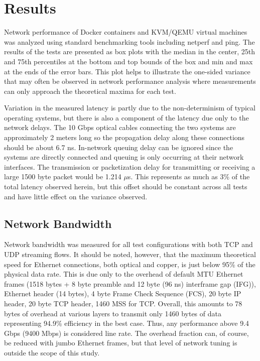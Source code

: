 \chapter{Results}
\label{cha:results}
\label{sec:results}
Network performance of Docker containers and KVM/QEMU virtual machines was analyzed using standard benchmarking tools including netperf and ping.  
The results of the tests are presented as box plots with the median in the center, 25th and 75th percentiles at the bottom and top bounds of the box and min and max at the ends of the error bars.
This plot helps to illustrate the one-sided variance that may often be observed in network performance analysis where measurements can only approach the theoretical maxima for each test.  

Variation in the measured latency is partly due to the non-determinism of typical operating systems, but there is also a component of the latency due only to the network delays.
The 10 Gbps optical cables connecting the two systems are approximately 2 meters long so the propagation delay along these connections should be about 6.7 ns.
In-network queuing delay can be ignored since the systems are directly connected and queuing is only occurring at their network interfaces.
The transmission or packetization delay for transmitting or receiving a large 1500 byte packet would be 1.214 $\mu$s.
This represents as much as 3\% of the total latency observed herein, but this offset should be constant across all tests and have little effect on the variance observed. 

\section{Network Bandwidth} %
\label{sec:networkbandwidth}
Network bandwidth was measured for all test configurations with both TCP and UDP streaming flows.
It should be noted, however, that the maximum theoretical speed for Ethernet connections, both optical and copper, is just below 95\% of the physical data rate.
This is due only to the overhead of default MTU Ethernet frames (1518 bytes + 8 byte preamble and 12 byte (96 ns) interframe gap (IFG)), Ethernet header (14 bytes), 4 byte Frame Check Sequence (FCS), 20 byte IP header, 20 byte TCP header, 1460 MSS for TCP.
Overall, this amounts to 78 bytes of overhead at various layers to transmit only 1460 bytes of data representing 94.9\% efficiency in the best case.  
Thus, any performance above 9.4 Gbps (9400 Mbps) is considered line rate.  
The overhead fraction can, of course, be reduced with jumbo Ethernet frames, but that level of network tuning is outside the scope of this study.

